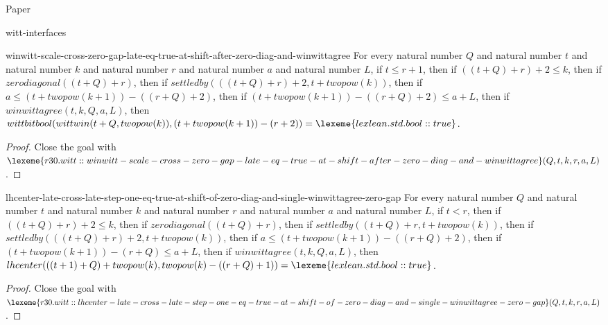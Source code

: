 \begin{lexlean}{Paper}
\begin{section}{witt-interfaces}
  \begin{theorem}{winwitt-scale-cross-zero-gap-late-eq-true-at-shift-after-zero-diag-and-winwittagree}
  For every natural number \(Q\) and natural number \(t\) and natural number \(k\) and natural number \(r\) and natural number \(a\) and natural number \(L\), if \(t ≤ r + 1\), then if \(((t + Q) + r) + 2 ≤ k\), then if \(zerodiagonal((t + Q) + r)\), then if \(settledby(((t + Q) + r) + 2, t + twopow(k))\), then if \(a ≤ (t + twopow(k + 1)) - ((r + Q) + 2)\), then if \((t + twopow(k + 1)) - ((r + Q) + 2) ≤ a + L\), then if \(winwittagree(t, k, Q, a, L)\), then \(wittbitbool(wittwin(t + Q, twopow(k)), (t + twopow(k + 1)) - (r + 2)) = \lexeme{lexlean.std.bool::true}\).
  \begin{proof}
  Close the goal with \(\lexeme{r30.witt::winwitt-scale-cross-zero-gap-late-eq-true-at-shift-after-zero-diag-and-winwittagree}(Q, t, k, r, a, L)\).
  \end{proof}
  \end{theorem}

  \begin{theorem}{lhcenter-late-cross-late-step-one-eq-true-at-shift-of-zero-diag-and-single-winwittagree-zero-gap}
  For every natural number \(Q\) and natural number \(t\) and natural number \(k\) and natural number \(r\) and natural number \(a\) and natural number \(L\), if \(t < r\), then if \(((t + Q) + r) + 2 ≤ k\), then if \(zerodiagonal((t + Q) + r)\), then if \(settledby((t + Q) + r, t + twopow(k))\), then if \(settledby(((t + Q) + r) + 2, t + twopow(k))\), then if \(a ≤ (t + twopow(k + 1)) - ((r + Q) + 2)\), then if \((t + twopow(k + 1)) - (r + Q) ≤ a + L\), then if \(winwittagree(t, k, Q, a, L)\), then \(lhcenter(((t + 1) + Q) + twopow(k), twopow(k) - ((r + Q) + 1)) = \lexeme{lexlean.std.bool::true}\).
  \begin{proof}
  Close the goal with \(\lexeme{r30.witt::lhcenter-late-cross-late-step-one-eq-true-at-shift-of-zero-diag-and-single-winwittagree-zero-gap}(Q, t, k, r, a, L)\).
  \end{proof}
  \end{theorem}


\end{section}
\end{lexlean}
